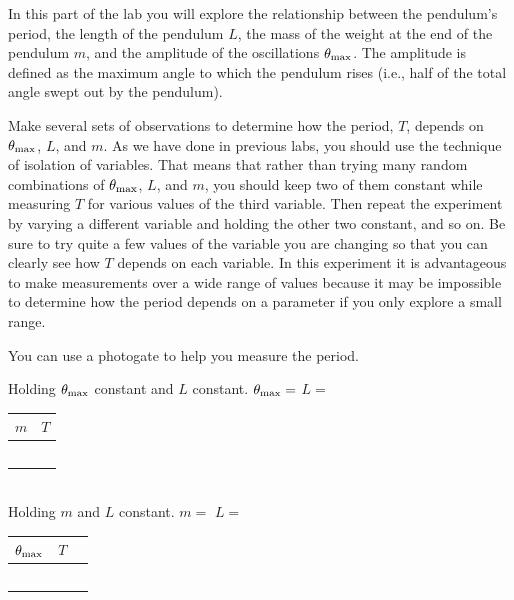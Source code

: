 \documentclass[11pt,letterpaper]{article}
\begin{document}
In this part of the lab you will explore the relationship between the pendulum's period, the length of the pendulum $L$, the mass of the weight at the end of the pendulum $m$, and the amplitude of the oscillations $\theta_{\rm{max}}$. The amplitude is defined as the maximum angle to which the pendulum rises (i.e., half of the total angle swept out by the pendulum). 

Make several sets of observations to determine how the period, $T$, depends on $\theta_{\rm{max}}$, $L$, and $m$.  As we have done in previous labs, you should use the technique of isolation of variables.  That means that rather than trying many random combinations of $\theta_{\rm{max}}$, $L$, and $m$, you should keep two of them constant while measuring $T$ for various values of the third variable. Then repeat the experiment by varying a different variable and holding the other two constant, and so on. Be sure to try quite a few values of the variable you are changing so that you can clearly see how $T$ depends on each variable. In this experiment it is advantageous to make measurements over a wide range of values because it may be impossible to determine how the period depends on a parameter if you only explore a small range.

You can use a photogate to help you measure the period.

\vspace{.5cm}

Holding $\theta_{\rm{max}}$ constant and $L$ constant.\hspace{1cm} $\theta_{\rm{max}}=$ \hspace{3cm} $L=$

\renewcommand{\arraystretch}{1.4}
\begin{tabularx}{0.5\linewidth}{|Y|Y|}
\hline
$m$ & $T$ \\
\hline &\\
\hline &\\
\hline &\\
\hline &\\
\hline &\\
\hline
\end{tabularx}\\

\vspace{.5cm}
\clearpage
Holding $m$ and $L$ constant.\hspace{1cm} $m=$ \hspace{3cm} $L=$

\begin{tabularx}{0.5\linewidth}{|Y|Y|Y|}
\hline
$\theta_{\rm{max}}$ & $T$ \\
\hline &\\
\hline &\\
\hline &\\
\hline &\\
\hline &\\
\hline
\end{tabularx}\\
\end{document}

